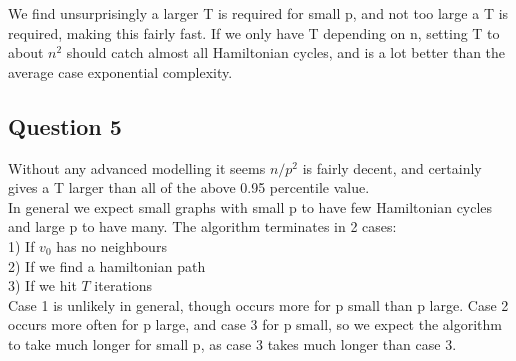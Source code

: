 \documentclass[10pt,a4paper]{report}
\begin{document}
We find unsurprisingly a larger T is required for small p, and not too large a T is required, making this fairly fast. If we only have T depending on n, setting T to about $n^2$ should catch almost all Hamiltonian cycles, and is a lot better than the average case exponential complexity.

\subsection*{Question 5}
Without any advanced modelling it seems $n/p^2$ is fairly decent, and certainly gives a T larger than all of the above 0.95 percentile value.\\





In general we expect small graphs with small p to have few Hamiltonian cycles and large p to have many. The algorithm terminates in 2 cases:\\

1) If $v_0$ has no neighbours\\
2) If we find a hamiltonian path \\
3) If we hit $T$ iterations\\

Case 1 is unlikely in general, though occurs more for p small than p large. Case 2 occurs more often for p large, and case 3 for p small, so we expect the algorithm to take much longer for small p, as case 3 takes much longer than case 3. \\
\end{document}
